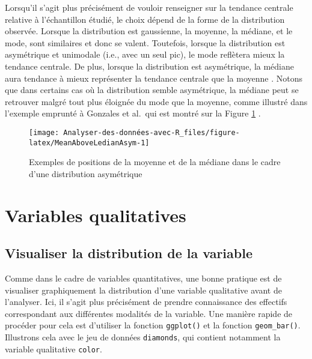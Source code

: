 \documentclass[
  french,
]{book}
\begin{document}
Lorsqu'il s'agit plus précisément de vouloir renseigner sur la tendance centrale relative à l'échantillon étudié, le choix dépend de la forme de la distribution observée. Lorsque la distribution est gaussienne, la moyenne, la médiane, et le mode, sont similaires et donc se valent. Toutefois, lorsque la distribution est asymétrique et unimodale (i.e., avec un seul pic), le mode reflètera mieux la tendance centrale. De plus, lorsque la distribution est asymétrique, la médiane aura tendance à mieux représenter la tendance centrale que la moyenne \autocite{rousseletReactionTimesOther2020}. Notons que dans certains cas où la distribution semble asymétrique, la médiane peut se retrouver malgré tout plus éloignée du mode que la moyenne, comme illustré dans l'exemple emprunté à Gonzales et al.~qui est montré sur la Figure \ref{fig:MeanAboveLedianAsym} \autocite*{gonzalesMeasuresCentralTendency2001}.

\begin{figure}

{\centering \texttt{[image: Analyser-des-données-avec-R\_files/figure-latex/MeanAboveLedianAsym-1]} 

}

\caption{Exemples de positions de la moyenne et de la médiane dans le cadre d'une distribution asymétrique}\label{fig:MeanAboveLedianAsym}
\end{figure}

\hypertarget{variables-qualitatives}{%
\section{Variables qualitatives}\label{variables-qualitatives}}

\hypertarget{visualiser-la-distribution-de-la-variable-1}{%
\subsection{Visualiser la distribution de la variable}\label{visualiser-la-distribution-de-la-variable-1}}

Comme dans le cadre de variables quantitatives, une bonne pratique est de visualiser graphiquement la distribution d'une variable qualitative avant de l'analyser. Ici, il s'agit plus précisément de prendre connaissance des effectifs correspondant aux différentes modalités de la variable. Une manière rapide de procéder pour cela est d'utiliser la fonction \texttt{ggplot()} et la fonction \texttt{geom\_bar()}. Illustrons cela avec le jeu de données \texttt{diamonds}, qui contient notamment la variable qualitative \texttt{color}.
\end{document}
